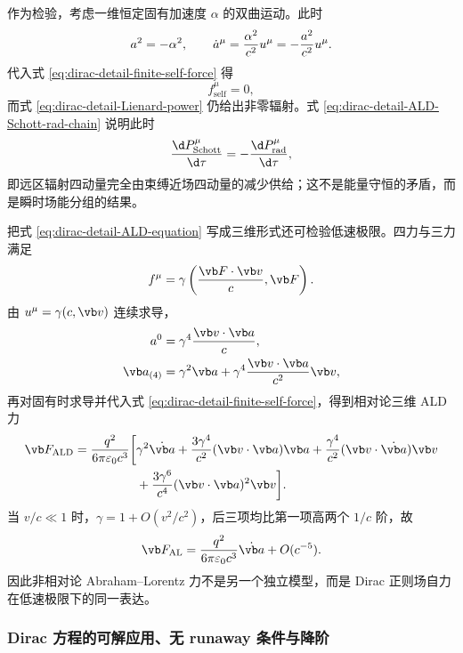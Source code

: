 作为检验，考虑一维恒定固有加速度 $\alpha$ 的双曲运动。此时
\begin{equation*}
 a^2=-\alpha^2,
 \qquad
 \dot a^\mu={\alpha^2\over c^2}u^\mu
 =-{a^2\over c^2}u^\mu.
\end{equation*}
代入式 \eqref{eq:dirac-detail-finite-self-force} 得
\begin{equation*}
 f_{\mathrm{self}}^\mu=0,
\end{equation*}
而式 \eqref{eq:dirac-detail-Lienard-power} 仍给出非零辐射。式 \eqref{eq:dirac-detail-ALD-Schott-rad-chain} 说明此时
\begin{equation*}
 {\d P_{\mathrm{Schott}}^\mu\over\d\tau}
 =-{\d P_{\mathrm{rad}}^\mu\over\d\tau},
\end{equation*}
即远区辐射四动量完全由束缚近场四动量的减少供给；这不是能量守恒的矛盾，而是瞬时场能分组的结果。

把式 \eqref{eq:dirac-detail-ALD-equation} 写成三维形式还可检验低速极限。四力与三力满足
\begin{equation*}
 f^\mu=\gamma\left({\vb F\cdot\vb v\over c},\vb F\right).
\end{equation*}
由 $u^\mu=\gamma(c,\vb v)$ 连续求导，
\begin{align*}
 a^0&=\gamma^4{\vb v\cdot\vb a\over c},\\
 \vb a_{(4)}&=\gamma^2\vb a
 +\gamma^4{\vb v\cdot\vb a\over c^2}\vb v,
\end{align*}
再对固有时求导并代入式 \eqref{eq:dirac-detail-finite-self-force}，得到相对论三维 ALD 力
\begin{align}
 \vb F_{\mathrm{ALD}}
 ={q^2\over6\pi\varepsilon_0c^3}
 \bigg[{}
 &\gamma^2\dot{\vb a}
 +{3\gamma^4\over c^2}(\vb v\cdot\vb a)\vb a
 +{\gamma^4\over c^2}(\vb v\cdot\dot{\vb a})\vb v
 \notag\\
 &+{3\gamma^6\over c^4}(\vb v\cdot\vb a)^2\vb v
 \bigg].
 \label{eq:dirac-detail-ALD-three-force}
\end{align}
当 $v/c\ll1$ 时，$\gamma=1+O(v^2/c^2)$，后三项均比第一项高两个 $1/c$ 阶，故
\begin{equation}
 \vb F_{\mathrm{AL}}
 ={q^2\over6\pi\varepsilon_0c^3}\dot{\vb a}
 +O(c^{-5}).
 \label{eq:dirac-detail-Abraham-Lorentz-limit}
\end{equation}
因此非相对论 Abraham--Lorentz 力不是另一个独立模型，而是 Dirac 正则场自力在低速极限下的同一表达。



\subsubsection{Dirac 方程的可解应用、无 runaway 条件与降阶}

